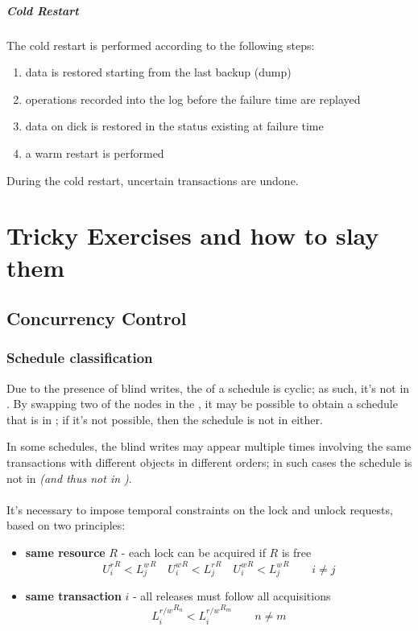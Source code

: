 \documentclass[english]{article}
\begin{document}
\subparagraph*{Cold Restart}
The cold restart is performed according to the following steps:

\begin{enumerate}
  \item data is restored starting from the last backup (dump)
  \item operations recorded into the log before the failure time are replayed
  \item data on dick is restored in the status existing at failure time
  \item a warm restart is performed
\end{enumerate}

During the cold restart, uncertain transactions are undone.

\clearpage

\section{Tricky Exercises and how to slay them}

\subsection{Concurrency Control}

\subsubsection{Schedule classification}

Due to the presence of blind writes, the \CG of a schedule is cyclic;
as such, it's not in \CSR.
By swapping two of the nodes in the \CG, it may be possible to obtain a schedule that is in \VSR;
if it's not possible, then the schedule is not in \VSR either.

In some schedules, the blind writes may appear multiple times involving the same transactions with different objects in different orders;
in such cases the schedule is not in \CSR \textit{(and thus not in \VSR)}.

\paragraph{\TPL}

It's necessary to impose temporal constraints on the lock and unlock requests, based on two principles:

\begin{itemize}
  \item \textbf{same resource} \(R\) - each lock can be acquired if \(R\) is free
        \[ {U^r_i}^R < {L^w_j}^R \quad {U^w_i}^R < {L^r_j}^R \quad {U^w_i}^R < {L^w_j}^R \qquad i \neq j \]
  \item \textbf{same transaction} \(i\) - all releases must follow all acquisitions
        \[{L^{r/w}_i}^{R_n} < {L^{r/w}_i}^{R_m} \qquad n \neq m \]
\end{itemize}
\end{document}
